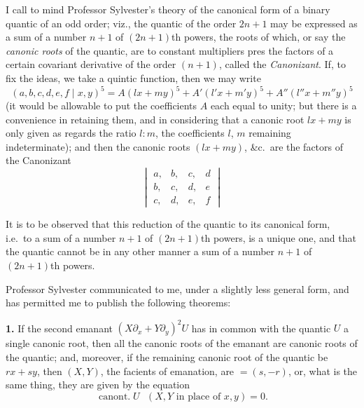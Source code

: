 \documentclass[11pt,a4paper]{article}
\newcommand{\canont}{\operatorname{canont.}}
\begin{document}
\noindent I call to mind Professor Sylvester's theory of the canonical form of a binary quantic of an odd order; viz., the quantic of the order $2n+1$ may be expressed as a sum of a number $n+1$ of $(2n+1)$th powers, the roots of which, or say the \emph{canonic roots} of the quantic, are to constant multipliers pres the factors of a certain covariant derivative of the order $(n+1)$, called the \emph{Canonizant}. If, to fix the ideas, we take a quintic function, then we may write
\[
(a,b,c,d,e,f\mid x,y)^5 = A(lx+my)^5 + A'(l'x+m'y)^5 + A''(l''x+m''y)^5
\]
(it would be allowable to put the coefficients $A$ each equal to unity; but there is a convenience in retaining them, and in considering that a canonic root $lx+my$ is only given as regards the ratio $l:m$, the coefficients $l$, $m$ remaining indeterminate); and then the canonic roots $(lx+my)$, \&c.\ are the factors of the Canonizant
\[
\begin{vmatrix}
a, & b, & c, & d \\
b, & c, & d, & e \\
c, & d, & e, & f
\end{vmatrix}
\]

It is to be observed that this reduction of the quantic to its canonical form, i.e.\ to a sum of a number $n+1$ of $(2n+1)$th powers, is a unique one, and that the quantic cannot be in any other manner a sum of a number $n+1$ of $(2n+1)$th powers.

\bigskip

\noindent Professor Sylvester communicated to me, under a slightly less general form, and has permitted me to publish the following theorems:

\medskip
\noindent \textbf{1.} If the second emanant $(X\partial_x + Y\partial_y)^2 U$ has in common with the quantic $U$ a single canonic root, then all the canonic roots of the emanant are canonic roots of the quantic; and, moreover, if the remaining canonic root of the quantic be $rx+sy$, then $(X,Y)$, the facients of emanation, are $=(s,-r)$, or, what is the same thing, they are given by the equation
\[
\canont U \text{ } (X,Y \text{ in place of } x,y) = 0.
\]
\end{document}
